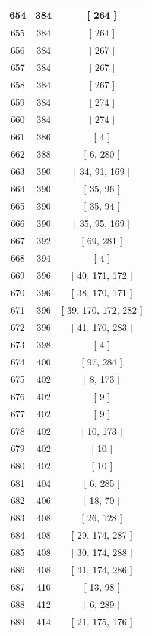 \begin{center}
\begin{longtable}[H]{|| c c c ||}
654 & 384 & [ 264 ]
\\\hline
655 & 384 & [ 264 ]
\\\hline
656 & 384 & [ 267 ]
\\\hline
657 & 384 & [ 267 ]
\\\hline
658 & 384 & [ 267 ]
\\\hline
659 & 384 & [ 274 ]
\\\hline
660 & 384 & [ 274 ]
\\\hline
661 & 386 & [ 4 ]
\\\hline
662 & 388 & [ 6, 280 ]
\\\hline
663 & 390 & [ 34, 91, 169 ]
\\\hline
664 & 390 & [ 35, 96 ]
\\\hline
665 & 390 & [ 35, 94 ]
\\\hline
666 & 390 & [ 35, 95, 169 ]
\\\hline
667 & 392 & [ 69, 281 ]
\\\hline
668 & 394 & [ 4 ]
\\\hline
669 & 396 & [ 40, 171, 172 ]
\\\hline
670 & 396 & [ 38, 170, 171 ]
\\\hline
671 & 396 & [ 39, 170, 172, 282 ]
\\\hline
672 & 396 & [ 41, 170, 283 ]
\\\hline
673 & 398 & [ 4 ]
\\\hline
674 & 400 & [ 97, 284 ]
\\\hline
675 & 402 & [ 8, 173 ]
\\\hline
676 & 402 & [ 9 ]
\\\hline
677 & 402 & [ 9 ]
\\\hline
678 & 402 & [ 10, 173 ]
\\\hline
679 & 402 & [ 10 ]
\\\hline
680 & 402 & [ 10 ]
\\\hline
681 & 404 & [ 6, 285 ]
\\\hline
682 & 406 & [ 18, 70 ]
\\\hline
683 & 408 & [ 26, 128 ]
\\\hline
684 & 408 & [ 29, 174, 287 ]
\\\hline
685 & 408 & [ 30, 174, 288 ]
\\\hline
686 & 408 & [ 31, 174, 286 ]
\\\hline
687 & 410 & [ 13, 98 ]
\\\hline
688 & 412 & [ 6, 289 ]
\\\hline
689 & 414 & [ 21, 175, 176 ]
\\\hline

\end{longtable}
\end{center}
